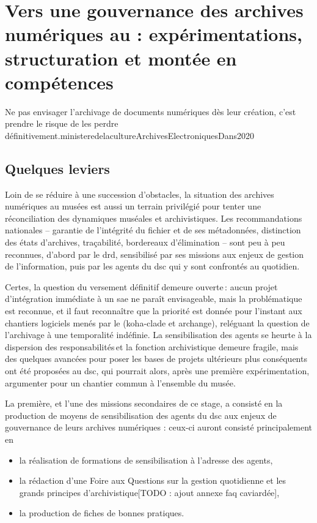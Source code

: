 \section{\label{II-C-2}Vers une gouvernance des archives numériques au \mae : expérimentations, structuration et montée en compétences}


\begin{myquote}
	{Ne pas envisager l’archivage de documents numériques dès leur création, c’est prendre le risque de les perdre définitivement.}{ministeredelacultureArchivesElectroniquesDans2020}
\end{myquote}

\subsection{Quelques leviers}


Loin de se réduire à une succession d’obstacles, la situation des archives numériques au musées est aussi un terrain privilégié pour tenter une réconciliation des dynamiques muséales et archivistiques. Les recommandations nationales – garantie de l'intégrité du fichier et de ses métadonnées, distinction des états d’archives, traçabilité, bordereaux d’élimination – sont peu à peu reconnues, d'abord par le \ac{drd}, sensibilisé par ses missions aux enjeux de gestion de l'information, puis par les agents du \ac{dsc} qui y sont confrontés au quotidien.



Certes, la question du versement définitif demeure ouverte : aucun projet d'intégration immédiate à un \gls{sae} ne paraît envisageable, mais la problématique est reconnue, et il faut reconnaître que la priorité est donnée pour l'instant aux chantiers logiciels menés par le \minarm (\gls{koha}-\gls{clade} et \gls{archange}), reléguant la question de l’archivage à une temporalité indéfinie. La sensibilisation des agents se heurte à la dispersion des responsabilités et la fonction archivistique demeure fragile, mais des quelques avancées pour poser les bases de projets ultérieurs plus conséquents ont été proposées au \ac{dsc}, qui pourrait alors, après une première expérimentation, argumenter pour un chantier commun à l'ensemble du musée.


La première, et l'une des missions secondaires de ce stage, a consisté en la production de moyens de sensibilisation des agents du \ac{dsc} aux enjeux de gouvernance de leurs archives numériques : ceux-ci auront consisté principalement en 
\begin{itemize}
	\item la réalisation de formations de sensibilisation à l’adresse des agents,
	\item la rédaction d’une Foire aux Questions sur la gestion quotidienne et les grands principes d'archivistique[TODO : ajout annexe faq caviardée],
	\item la production de fiches de bonnes pratiques.
\end{itemize}

